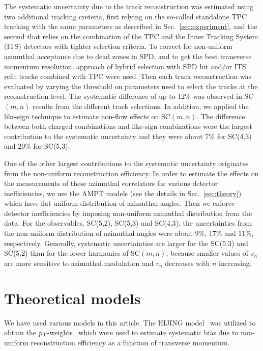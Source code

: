 The systematic uncertainty due to the track reconstruction was estimated using two additional tracking creteria, first relying on the so-called standalone TPC tracking with the 
same parameters as described in Sec.~\ref{sec:experiment}, and the second that relies on the combination of the TPC and the Inner Tracking System (ITS) detectors with tighter selection criteria.
To correct for non-uniform azimuthal acceptance due to dead zones in SPD, and to get the best transverse momentum resolution, approach of hybrid selection with SPD hit and/or ITS refit tracks combined with TPC were used. Then each track reconstruction was evaluated by varying the threshold on parameters used to select the tracks at the reconstruction level. 
The systematic difference of up to 12\% was observed in SC$(m,n)$ results from the different track selections. 
In addition, we applied the like-sign technique to estimate non-flow effects on SC$(m,n)$. The difference between both charged combinations and like-sign combinations were the largest contribution to the systematic uncertainty and they were about 7\% for SC(4,3) and 20\% for SC(5,3). 

One of the other largest contributions to the systematic uncertainty originates from the non-uniform reconstruction efficiency. In order to estimate the effects on the measurements of these azimuthal correlators for various detector inefficiencies, we use the AMPT models (see the details in Sec.~\ref{sec:theory}) which have flat uniform distribution of azimuthal angles. Then we enforce detector inefficiencies by imposing non-uniform azimuthal distribution from the data. For the observables, SC(5,2), SC(5,3) and SC(4,3), the uncertainties from the non-uniform distribution of azimuthal angles were about 9\%, 17\% and 11\%, respectively.
Generally, systematic uncertainties are larger for the SC(5,3) and SC(5,2) than for the lower harmonics of SC$(m,n)$, because smaller values of $v_n$ are more sensitive to azimuthal modulation and $v_n$ decreases with $n$ increasing. 

\section{Theoretical models}
\label{sec:models}
We have used various models in this article. The {HIJING} model~\cite{Wang:1991hta,Gyulassy:1994ew} was utilized to obtain the $p_{\rm T}$-weights~\cite{Bilandzic:2013kga} which were used to estimate systematic bias due to non-uniform reconstruction efficiency as a function of transverse momentum. 

